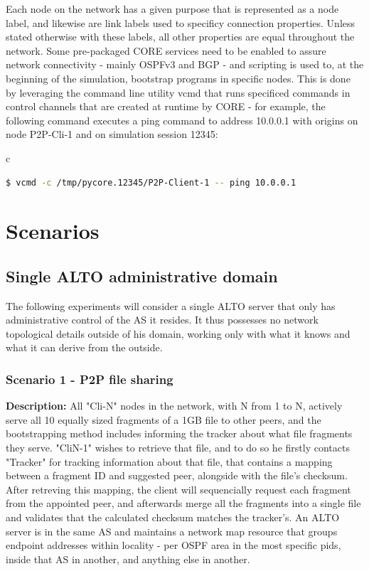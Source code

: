     Each node on the network has a given purpose that is represented as a node label, and likewise are link labels used to specificy connection properties.
    Unless stated otherwise with these labels, all other properties are equal throughout the network.
    Some pre-packaged CORE services need to be enabled to assure network connectivity - mainly OSPFv3 and BGP - and scripting is used to, at the beginning of the simulation, bootstrap programs in specific nodes.
    This is done by leveraging the command line utility vcmd that runs specificed commands in control channels that are created at runtime by CORE - for example, the following command executes a ping command to address 10.0.0.1 with origins on node P2P-Cli-1 and on simulation session 12345:

    \begin{center}
    \begin{tabular}{c}
    \begin{lstlisting}[caption=Execution of an example command through the control channel of a given node, language=bash]
        $ vcmd -c /tmp/pycore.12345/P2P-Client-1 -- ping 10.0.0.1
    \end{lstlisting}
    \end{tabular}
    \end{center}

\section{Scenarios}

\subsection{Single ALTO administrative domain}

    The following experiments will consider a single ALTO server that only has administrative control of the AS it resides.
    It thus possesses no network topological details outside of his domain, working only with what it knows and what it can derive from the outside.

\subsubsection{Scenario 1 - P2P file sharing}
\textbf{Description:} All "Cli-N" nodes in the network, with N from 1 to N, actively serve all 10 equally sized fragments of a 1GB file to other peers, and the bootstrapping method includes informing the tracker about what file fragments they serve.
    "CliN-1" wishes to retrieve that file, and to do so he firstly contacts "Tracker" for tracking information about that file, that contains a mapping between a fragment ID and suggested peer, alongside with the file's checksum.
    After retreving this mapping, the client will sequencially request each fragment from the appointed peer, and afterwards merge all the fragments into a single file and validates that the calculated checksum matches the tracker's.
    An ALTO server is in the same AS and maintains a network map resource that groups endpoint addresses within locality - per OSPF area in the most specific pids, inside that AS in another, and anything else in another.


